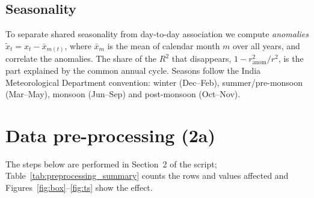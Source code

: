 \documentclass[11pt,a4paper]{article}
\newcommand{\Rsq}{R^2}
\begin{document}
\subsection{Seasonality}
To separate shared seasonality from day-to-day association we compute
\emph{anomalies} $\tilde x_t=x_t-\bar x_{m(t)}$, where $\bar x_{m}$ is the mean of
calendar month $m$ over all years, and correlate the anomalies. The share of the
$\Rsq$ that disappears, $1-r_{\text{anom}}^2/r^2$, is the part explained by the
common annual cycle. Seasons follow the India Meteorological Department
convention: winter (Dec--Feb), summer/pre-monsoon (Mar--May), monsoon (Jun--Sep)
and post-monsoon (Oct--Nov).

\section{Data pre-processing (2a)}
\label{sec:prep}

The steps below are performed in Section~2 of the script; Table~\ref{tab:preprocessing_summary}
counts the rows and values affected and Figures~\ref{fig:box}--\ref{fig:ts} show
the effect.
\end{document}
